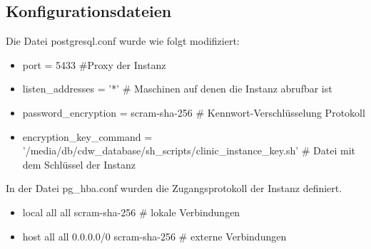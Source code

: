    \subsection{Konfigurationsdateien}
    Die Datei \textsf{postgresql.conf} wurde wie folgt modifiziert:
    \begin{itemize}
    	\item \textsf{port = 5433} \#Proxy der Instanz
    	\item \textsf{listen\_addresses = '*'} \# Maschinen auf denen die Instanz abrufbar ist
    	\item \textsf{password\_encryption = scram-sha-256} \# Kennwort-Verschlüsselung Protokoll
    	\item \textsf{encryption\_key\_command = '/media/db/cdw\_database/sh\_scripts/clinic\_instance\_key.sh'} \# Datei mit dem Schlüssel der Instanz
    \end{itemize}

	In der Datei \textsf{pg\_hba.conf} wurden die Zugangsprotokoll der Instanz definiert.
	\begin{itemize}
		\item \textsf{local   all     all                      scram-sha-256} \# lokale Verbindungen
		\item \textsf{host    all             all              0.0.0.0/0         scram-sha-256} \# externe Verbindungen
	\end{itemize}

